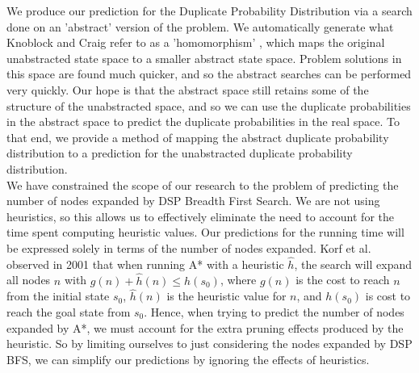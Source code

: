 \documentclass{article}
\begin{document}
We produce our prediction for the Duplicate Probability Distribution via a
search done on an 'abstract' version of the problem.
We automatically generate what Knoblock and Craig refer to as a 'homomorphism' \cite{knoblock1994automatically},
which maps the original unabstracted state space to a smaller abstract state space.
Problem solutions in this space are found much quicker, and so the abstract searches can be performed
very quickly. Our hope is that the abstract space still retains some of the structure of the
unabstracted space, and so we can use the duplicate probabilities in the abstract space
to predict the duplicate probabilities in the real space. To that end,
we provide a method of mapping the abstract duplicate probability distribution to a prediction
for the unabstracted duplicate probability distribution. \\

We have constrained the scope of our research to the problem of predicting the number of nodes expanded
by DSP Breadth First Search. We are not using heuristics,
so this allows us to effectively eliminate the need to account for
the time spent computing heuristic values. Our predictions for the running time
will be expressed solely in terms of the number of nodes expanded.
Korf et al. observed in 2001 \cite{korf2001time} that when running A* with a heuristic \(\hat{h}\),
the search will expand all nodes \(n\) with \(g(n) + \hat{h}(n) \leq h(s_0)\),
where \(g(n)\) is the cost to reach \(n\) from the initial state \(s_0\),
\(\hat{h}(n)\) is the heuristic value for \(n\), and \(h(s_0)\) is cost to reach the goal state from \(s_0\).
Hence, when trying to predict the number of nodes expanded by A*,
we must account for the extra pruning effects produced by the heuristic.
So by limiting ourselves to just considering the nodes expanded by DSP BFS,
we can simplify our predictions by ignoring the effects of heuristics. \\
\end{document}
